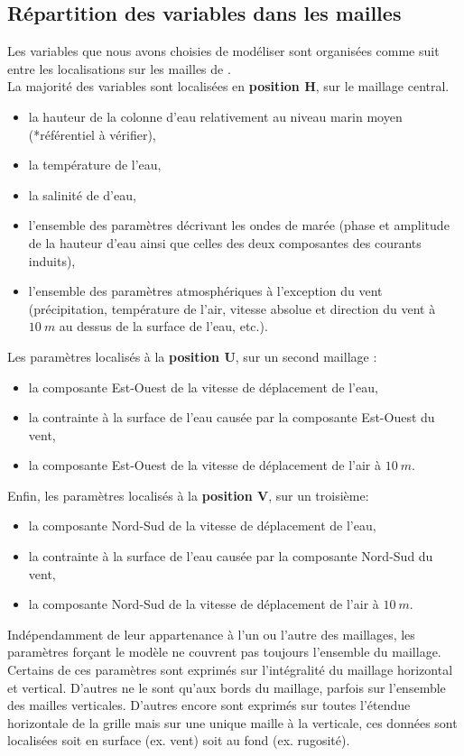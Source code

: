 \documentclass[10pt,a4paper,titlepage]{article}
\begin{document}
    \subsection{Répartition des variables dans les mailles}
    Les variables que nous avons choisies de modéliser sont organisées comme suit entre les localisations sur les mailles de \cite{Arakawa_C-grid_1977}.\\
    La majorité des variables sont localisées en \textbf{position H}, sur le maillage central.
    \begin{itemize}
        \item la hauteur de la colonne d'eau relativement au niveau marin moyen (*référentiel à vérifier),
        \item la température de l'eau,
        \item la salinité de d'eau,
        \item l'ensemble des paramètres décrivant les ondes de marée (phase et amplitude de la hauteur d'eau ainsi que celles des deux composantes des courants induits),
        \item l'ensemble des paramètres atmosphériques à l'exception du vent (précipitation, température de l'air, vitesse absolue et direction du vent à $10~m$ au dessus de la surface de l'eau, etc.).
    \end{itemize}
    Les paramètres localisés à la \textbf{position U}, sur un second maillage :
    \begin{itemize}
        \item la composante Est-Ouest de la vitesse de déplacement de l'eau,
        \item la contrainte à la surface de l'eau causée par la composante Est-Ouest du vent,
        \item la composante Est-Ouest de la vitesse de déplacement de l'air à $10~m$.
    \end{itemize}
    Enfin, les paramètres localisés à la \textbf{position V}, sur un troisième:
    \begin{itemize}
        \item la composante Nord-Sud de la vitesse de déplacement de l'eau,
        \item la contrainte à la surface de l'eau causée par la composante Nord-Sud du vent,
        \item la composante Nord-Sud de la vitesse de déplacement de l'air à $10~m$.
    \end{itemize}
    
    Indépendamment de leur appartenance à l'un ou l'autre des maillages, les paramètres forçant le modèle ne couvrent pas toujours l'ensemble du maillage.
    Certains de ces paramètres sont exprimés sur l'intégralité du maillage horizontal et vertical.
    D'autres ne le sont qu'aux bords du maillage, parfois sur l'ensemble des mailles verticales.
    D'autres encore sont exprimés sur toutes l'étendue horizontale de la grille mais sur une unique maille à la verticale, ces données sont localisées soit en surface (ex. vent) soit au fond (ex. rugosité).
    
\end{document}
